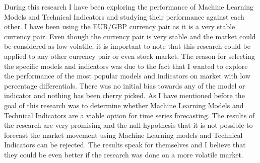 \documentclass{imc-inf}
\begin{document}
		
	During this research I have been exploring the performance of Machine Learning Models and Technical Indicators and studying their performance against each other. I have been using the EUR/GBP currency pair as it is a very stable currency pair.
	Even though the currency pair is very stable and the market could be considered as low volatile, it is important to note that this research could be applied to any other currency pair or even stock market.
	The reason for selecting the specific models and indicators was due to the fact that I wanted to explore the performance of the most popular models and indicators on market with low percentage differentials.
	There was no initial bias towards any of the model or indicator and nothing has been cherry picked. As I have mentioned before the goal of this research was to determine whether Machine Learning Models 
	and Technical Indicators are a viable option for time series forecasting. The results of the research are very promising and the null hypothesis that it is not possible to forecast the market movement using Machine Learning models
	and Technical Indicators can be rejected. The results speak for themselves and I believe that they could be even better if the research was done on a more volatile market.
	
	
	
	
	
	\backmatter%
	
	\typeout{}
	
	
\end{document}
